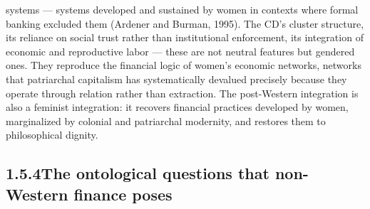 systems — systems developed and sustained by women in contexts where formal banking excluded them (Ardener and Burman, 1995). The CD’s cluster structure, its reliance on social trust rather than institutional enforcement, its integration of economic and reproductive labor — these are not neutral features but gendered ones. They reproduce the financial logic of women’s economic networks, networks that patriarchal capitalism has systematically devalued precisely because they operate through relation rather than extraction. The post-Western integration is also a feminist integration: it recovers financial practices developed by women, marginalized by colonial and patriarchal modernity, and restores them to philosophical dignity.

\subsection{1.5.4\quad The ontological questions that non-Western finance poses}

